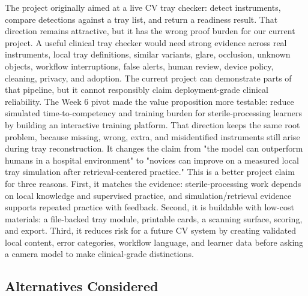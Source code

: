 \documentclass[10pt,a4paper]{article}
\begin{document}
The project originally aimed at a live CV tray checker: detect instruments,
compare detections against a tray list, and return a readiness result. That
direction remains attractive, but it has the wrong proof burden for our current
project. A useful clinical tray checker would need strong evidence across real
instruments, local tray definitions, similar variants, glare, occlusion,
unknown objects, workflow interruptions, false alerts, human review, device
policy, cleaning, privacy, and adoption. The current project can demonstrate
parts of that pipeline, but it cannot responsibly claim deployment-grade
clinical reliability.
The Week 6 pivot made the value proposition more testable: reduce simulated
time-to-competency and training burden for sterile-processing learners by
building an interactive training platform. That direction keeps the same root
problem, because missing, wrong, extra, and misidentified instruments still
arise during tray reconstruction. It changes the claim from "the model can
outperform humans in a hospital environment" to "novices can improve on a
measured local tray simulation after retrieval-centered practice."
This is a better project claim for three reasons. First, it matches the evidence:
sterile-processing work depends on local knowledge and supervised practice, and
simulation/retrieval evidence supports repeated practice with feedback. Second,
it is buildable with low-cost materials: a file-backed tray module, printable
cards, a scanning surface, scoring, and export. Third, it reduces risk for a
future CV system by creating validated local content, error categories,
workflow language, and learner data before asking a camera model to make
clinical-grade distinctions.
\subsection{Alternatives Considered}
\end{document}
